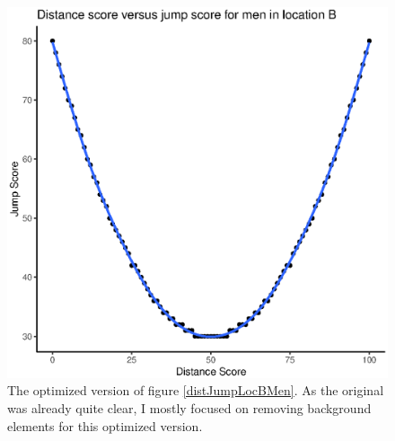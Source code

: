 \documentclass[runningheads]{llncs}
\begin{document}
\begin{figure}
\begin{multicols}{2}
    \includegraphics[width=\linewidth]{distJumpLocBMenOpt.eps} \vspace{-0.8cm} \caption{The optimized version of figure \ref{distJumpLocBMen}. As the original was already quite clear, I mostly focused on removing background elements for this optimized version.} \label{distJumpLocBMenOpt} \par

\end{multicols}
\end{figure}
%
%
\end{document}
